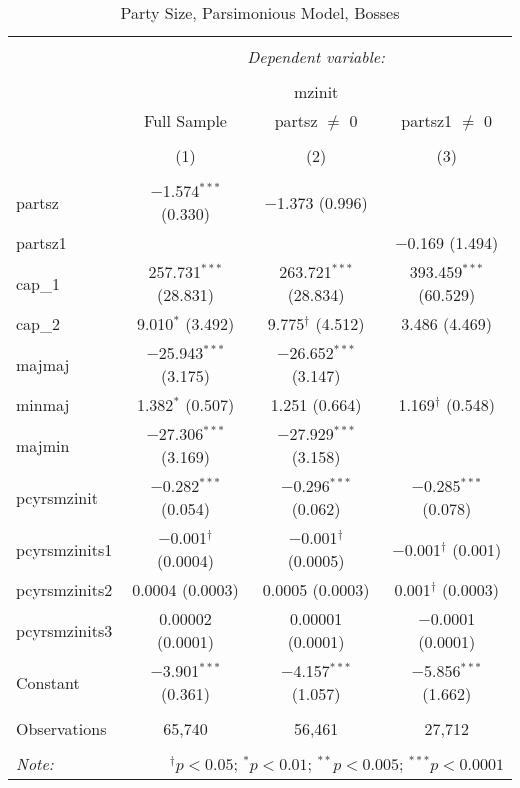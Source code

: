 
\begin{table}[!htbp] \centering 
  \caption{Party Size, Parsimonious Model, Bosses} 
  \label{} 
\begin{tabular}{@{\extracolsep{5pt}}lccc} 
\\[-1.8ex]\hline 
\hline \\[-1.8ex] 
 & \multicolumn{3}{c}{\textit{Dependent variable:}} \\ 
\cline{2-4} 
\\[-1.8ex] & \multicolumn{3}{c}{mzinit} \\ 
 & Full Sample & partsz $\neq$ 0 & partsz1 $\neq$ 0 \\ 
\\[-1.8ex] & (1) & (2) & (3)\\ 
\hline \\[-1.8ex] 
 partsz & $-$1.574$^{***}$ (0.330) & $-$1.373 (0.996) &  \\ 
  partsz1 &  &  & $-$0.169 (1.494) \\ 
  cap\_1 & 257.731$^{***}$ (28.831) & 263.721$^{***}$ (28.834) & 393.459$^{***}$ (60.529) \\ 
  cap\_2 & 9.010$^{*}$ (3.492) & 9.775$^{\dagger}$ (4.512) & 3.486 (4.469) \\ 
  majmaj & $-$25.943$^{***}$ (3.175) & $-$26.652$^{***}$ (3.147) &  \\ 
  minmaj & 1.382$^{*}$ (0.507) & 1.251 (0.664) & 1.169$^{\dagger}$ (0.548) \\ 
  majmin & $-$27.306$^{***}$ (3.169) & $-$27.929$^{***}$ (3.158) &  \\ 
  pcyrsmzinit & $-$0.282$^{***}$ (0.054) & $-$0.296$^{***}$ (0.062) & $-$0.285$^{***}$ (0.078) \\ 
  pcyrsmzinits1 & $-$0.001$^{\dagger}$ (0.0004) & $-$0.001$^{\dagger}$ (0.0005) & $-$0.001$^{\dagger}$ (0.001) \\ 
  pcyrsmzinits2 & 0.0004 (0.0003) & 0.0005 (0.0003) & 0.001$^{\dagger}$ (0.0003) \\ 
  pcyrsmzinits3 & 0.00002 (0.0001) & 0.00001 (0.0001) & $-$0.0001 (0.0001) \\ 
  Constant & $-$3.901$^{***}$ (0.361) & $-$4.157$^{***}$ (1.057) & $-$5.856$^{***}$ (1.662) \\ 
 \hline \\[-1.8ex] 
Observations & 65,740 & 56,461 & 27,712 \\ 
\hline 
\hline \\[-1.8ex] 
\textit{Note:}  & \multicolumn{3}{r}{$^{\dagger} p<0.05$; $^{*} p<0.01$; $^{**} p<0.005$; $^{***} p<0.0001$} \\ 
\end{tabular} 
\end{table} 
